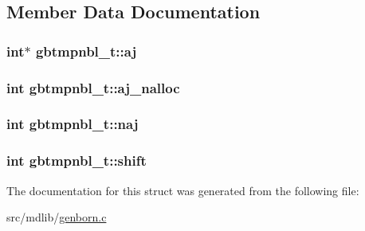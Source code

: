 \subsection{\-Member \-Data \-Documentation}
\hypertarget{structgbtmpnbl__t_a1802dd0047b141c167ec9221e540a094}{
\subsubsection[{aj}]{\setlength{\rightskip}{0pt plus 5cm}int$\ast$ {\bf gbtmpnbl\-\_\-t\-::aj}}}\label{structgbtmpnbl__t_a1802dd0047b141c167ec9221e540a094}
\hypertarget{structgbtmpnbl__t_a382798f061edba02124a61b651a70209}{
\subsubsection[{aj\-\_\-nalloc}]{\setlength{\rightskip}{0pt plus 5cm}int {\bf gbtmpnbl\-\_\-t\-::aj\-\_\-nalloc}}}\label{structgbtmpnbl__t_a382798f061edba02124a61b651a70209}
\hypertarget{structgbtmpnbl__t_a8ffd80e6193de34eb58ef0e56d7510d0}{
\subsubsection[{naj}]{\setlength{\rightskip}{0pt plus 5cm}int {\bf gbtmpnbl\-\_\-t\-::naj}}}\label{structgbtmpnbl__t_a8ffd80e6193de34eb58ef0e56d7510d0}
\hypertarget{structgbtmpnbl__t_a292dcf5e2c435f762d5261464cb2c325}{
\subsubsection[{shift}]{\setlength{\rightskip}{0pt plus 5cm}int {\bf gbtmpnbl\-\_\-t\-::shift}}}\label{structgbtmpnbl__t_a292dcf5e2c435f762d5261464cb2c325}


\-The documentation for this struct was generated from the following file\-:\begin{DoxyCompactItemize}
\item 
src/mdlib/\hyperlink{genborn_8c}{genborn.\-c}\end{DoxyCompactItemize}
